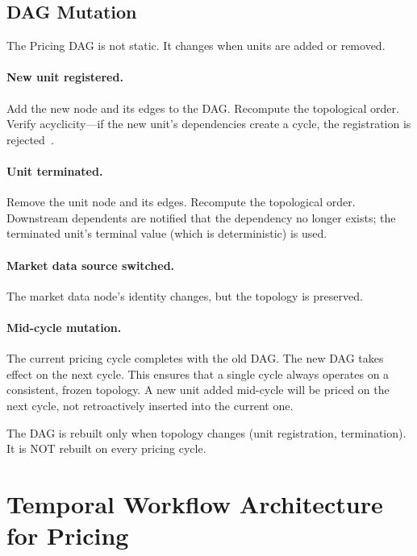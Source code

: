 \documentclass[11pt,a4paper]{article}
\begin{document}
\subsection{DAG Mutation}
\label{sec:dag-mutation}

The Pricing DAG is not static.  It changes when units are added or removed.

\paragraph{New unit registered.}  Add the new node and its edges to the DAG.  Recompute the topological order.  Verify acyclicity---if the new unit's dependencies create a cycle, the registration is rejected~\cite[\S3.4]{ledger}.

\paragraph{Unit terminated.}  Remove the unit node and its edges.  Recompute the topological order.  Downstream dependents are notified that the dependency no longer exists; the terminated unit's terminal value (which is deterministic) is used.

\paragraph{Market data source switched.}  The market data node's identity changes, but the topology is preserved.

\paragraph{Mid-cycle mutation.}  The current pricing cycle completes with the old DAG.  The new DAG takes effect on the next cycle.  This ensures that a single cycle always operates on a consistent, frozen topology.  A new unit added mid-cycle will be priced on the next cycle, not retroactively inserted into the current one.

\noindent The DAG is rebuilt only when topology changes (unit registration, termination).  It is NOT rebuilt on every pricing cycle.

\clearpage
\section{Temporal Workflow Architecture for Pricing}
\label{sec:temporal}
\end{document}
